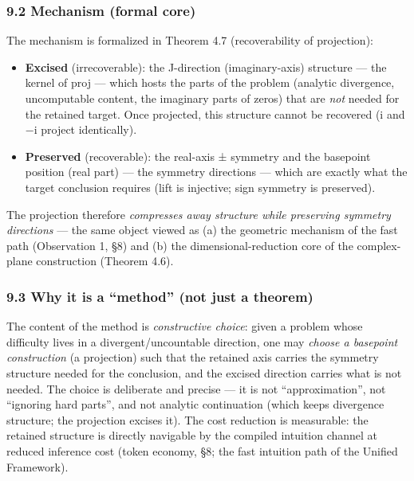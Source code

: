 \documentclass[
]{article}
\providecommand{\tightlist}{%
  \setlength{\itemsep}{0pt}\setlength{\parskip}{0pt}}
\begin{document}
\subsubsection{9.2 Mechanism (formal core)}\label{mechanism-formal-core}

The mechanism is formalized in Theorem 4.7 (recoverability of
projection):

\begin{itemize}
\tightlist
\item
  \textbf{Excised} (irrecoverable): the J-direction (imaginary-axis)
  structure --- the kernel of proj --- which hosts the parts of the
  problem (analytic divergence, uncomputable content, the imaginary
  parts of zeros) that are \emph{not} needed for the retained target.
  Once projected, this structure cannot be recovered (i and −i project
  identically).
\item
  \textbf{Preserved} (recoverable): the real-axis ± symmetry and the
  basepoint position (real part) --- the symmetry directions --- which
  are exactly what the target conclusion requires (lift is injective;
  sign symmetry is preserved).
\end{itemize}

The projection therefore \emph{compresses away structure while
preserving symmetry directions} --- the same object viewed as (a) the
geometric mechanism of the fast path (Observation 1, §8) and (b) the
dimensional-reduction core of the complex-plane construction (Theorem
4.6).

\subsubsection{9.3 Why it is a ``method'' (not just a
theorem)}\label{why-it-is-a-method-not-just-a-theorem}

The content of the method is \emph{constructive choice}: given a problem
whose difficulty lives in a divergent/uncountable direction, one may
\emph{choose a basepoint construction} (a projection) such that the
retained axis carries the symmetry structure needed for the conclusion,
and the excised direction carries what is not needed. The choice is
deliberate and precise --- it is not ``approximation'', not ``ignoring
hard parts'', and not analytic continuation (which keeps divergence
structure; the projection excises it). The cost reduction is measurable:
the retained structure is directly navigable by the compiled intuition
channel at reduced inference cost (token economy, §8; the fast intuition
path of the Unified Framework).
\end{document}
